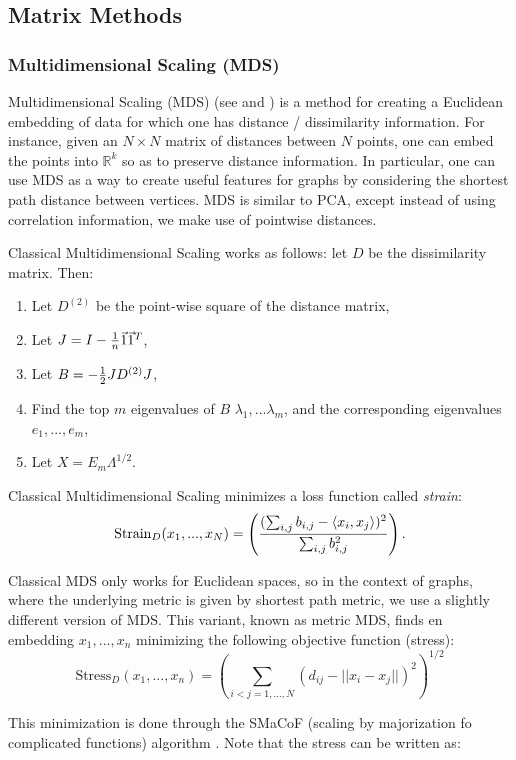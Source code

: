 \subsection{Matrix Methods}
\subsubsection*{Multidimensional Scaling (MDS)}
Multidimensional Scaling (MDS) (see \cite{cox2000multidimensional} and \cite{borg2003modern}) is a method for creating a Euclidean embedding of data for which one has distance / dissimilarity information. For instance, given an $N \times N$ matrix of distances between $N$ points, one can embed the points into $\mathbb{R}^k$ so as to preserve distance information. In particular, one can use MDS as a way to create useful features for graphs by considering the shortest path distance between vertices. MDS is similar to PCA, except instead of using correlation information, we make use of pointwise distances.

Classical Multidimensional Scaling works as follows: let $D$ be the dissimilarity matrix. Then:
\begin{enumerate}
  \item Let $D^{(2)}$ be the point-wise square of the distance matrix,
  \item Let $J = I - {1\over n}\vec{1}\vec{1}^T$,
  \item Let $B = -{1 \over 2}JD^{(2)}J$,
  \item Find the top $m$ eigenvalues of $B$ $\lambda_1, ... \lambda_m$, and the corresponding eigenvalues $e_1, ... , e_m$,
  \item Let $X = E_m\Lambda^{1/2}$.
\end{enumerate}

Classical Multidimensional Scaling minimizes a loss function called \emph{strain}:
\[
    \text{Strain}_D(x_1, ... , x_N) = \left( ({\sum_{i,j}b_{i,j}- \langle x_i,x_j \rangle})^2 \over \sum_{i,j}b_{i,j}^2\right).
\]

Classical MDS only works for Euclidean spaces, so in the context of graphs, where the underlying metric is given by shortest path metric, we use a slightly different version of MDS. This variant, known as metric MDS, finds en embedding $x_1, ... , x_n$ minimizing the following objective function (stress):
\[
    \text{Stress}_D(x_1, ... , x_n) = \left(\sum_{i < j = 1, ... ,N}(d_{ij} - ||x_i - x_j||)^2\right)^{1/2}
\]

This minimization is done through the SMaCoF (scaling by majorization fo complicated functions) algorithm \cite{de2011applications}. Note that the stress can be written as:

